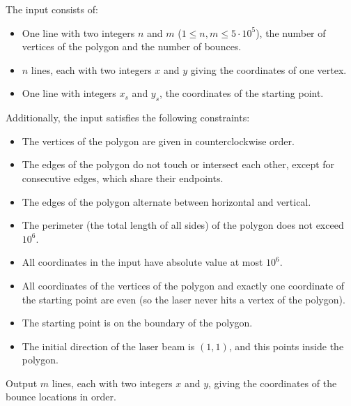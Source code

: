 \begin{Input}
	The input consists of:
  \begin{itemize}
    \item One line with two integers $n$ and $m$ ($1 \le n,m \le 5\cdot 10^5$),
      the number of vertices of the polygon and the number of bounces.
    \item $n$ lines, each with two integers $x$ and $y$ giving the coordinates of one vertex.
    \item One line with integers $x_s$ and $y_s$, the coordinates of the starting point.
  \end{itemize}
  \newpage
  Additionally, the input satisfies the following constraints:
  \begin{itemize}
    \item The vertices of the polygon are given in counterclockwise order.
    \item The edges of the polygon do not touch or intersect each other, except
      for consecutive edges, which share their endpoints.
    \item The edges of the polygon alternate between horizontal and vertical.
    \item The perimeter (the total length of all sides) of the polygon does not
      exceed $10^6$.
    \item All coordinates in the input have absolute value at most $10^6$.
    \item All coordinates of the vertices of the polygon and exactly one
      coordinate of the starting point are even (so the laser never hits a
      vertex of the polygon).
    \item The starting point is on the boundary of the polygon.
    \item The initial direction of the laser beam is $(1,1)$, and this points
      inside the polygon.
  \end{itemize}
\end{Input}

\begin{Output}
  Output $m$ lines, each with two integers $x$ and $y$, giving the coordinates
  of the bounce locations in order.
\end{Output}
